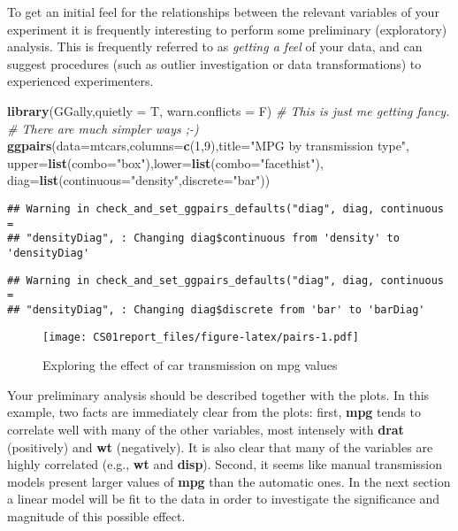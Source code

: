 \documentclass[]{article}
\newenvironment{Shaded}{\begin{snugshade}}{\end{snugshade}}
\newcommand{\CommentTok}[1]{\textcolor[rgb]{0.56,0.35,0.01}{\textit{#1}}}
\newcommand{\DataTypeTok}[1]{\textcolor[rgb]{0.13,0.29,0.53}{#1}}
\newcommand{\DecValTok}[1]{\textcolor[rgb]{0.00,0.00,0.81}{#1}}
\newcommand{\KeywordTok}[1]{\textcolor[rgb]{0.13,0.29,0.53}{\textbf{#1}}}
\newcommand{\NormalTok}[1]{#1}
\newcommand{\StringTok}[1]{\textcolor[rgb]{0.31,0.60,0.02}{#1}}
\begin{document}
To get an initial feel for the relationships between the relevant
variables of your experiment it is frequently interesting to perform
some preliminary (exploratory) analysis. This is frequently referred to
as \emph{getting a feel} of your data, and can suggest procedures (such
as outlier investigation or data transformations) to experienced
experimenters.

\begin{Shaded}
\begin{Highlighting}[]
\KeywordTok{library}\NormalTok{(GGally,}\DataTypeTok{quietly =}\NormalTok{ T, }\DataTypeTok{warn.conflicts =}\NormalTok{ F) }\CommentTok{# This is just me getting fancy.}
                                                \CommentTok{# There are much simpler ways ;-)}
\KeywordTok{ggpairs}\NormalTok{(}\DataTypeTok{data=}\NormalTok{mtcars,}\DataTypeTok{columns=}\KeywordTok{c}\NormalTok{(}\DecValTok{1}\NormalTok{,}\DecValTok{9}\NormalTok{),}\DataTypeTok{title=}\StringTok{"MPG by transmission type"}\NormalTok{,}
        \DataTypeTok{upper=}\KeywordTok{list}\NormalTok{(}\DataTypeTok{combo=}\StringTok{"box"}\NormalTok{),}\DataTypeTok{lower=}\KeywordTok{list}\NormalTok{(}\DataTypeTok{combo=}\StringTok{"facethist"}\NormalTok{),}
        \DataTypeTok{diag=}\KeywordTok{list}\NormalTok{(}\DataTypeTok{continuous=}\StringTok{"density"}\NormalTok{,}\DataTypeTok{discrete=}\StringTok{"bar"}\NormalTok{))}
\end{Highlighting}
\end{Shaded}

\begin{verbatim}
## Warning in check_and_set_ggpairs_defaults("diag", diag, continuous =
## "densityDiag", : Changing diag$continuous from 'density' to 'densityDiag'
\end{verbatim}

\begin{verbatim}
## Warning in check_and_set_ggpairs_defaults("diag", diag, continuous =
## "densityDiag", : Changing diag$discrete from 'bar' to 'barDiag'
\end{verbatim}

\begin{figure}
\centering
\texttt{[image: CS01report\_files/figure-latex/pairs-1.pdf]}
\caption{Exploring the effect of car transmission on mpg values}
\end{figure}

Your preliminary analysis should be described together with the plots.
In this example, two facts are immediately clear from the plots: first,
\textbf{mpg} tends to correlate well with many of the other variables,
most intensely with \textbf{drat} (positively) and \textbf{wt}
(negatively). It is also clear that many of the variables are highly
correlated (e.g., \textbf{wt} and \textbf{disp}). Second, it seems like
manual transmission models present larger values of \textbf{mpg} than
the automatic ones. In the next section a linear model will be fit to
the data in order to investigate the significance and magnitude of this
possible effect.
\end{document}
